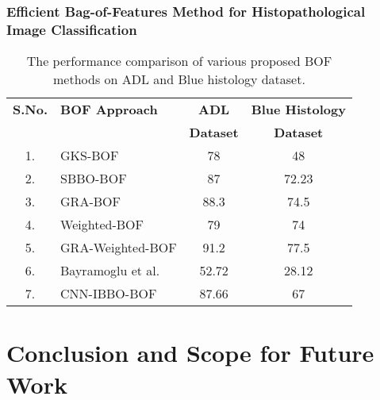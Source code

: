 \documentclass [9pt,times] {beamer}
\begin{document}
\begin{frame}\frametitle{Efficient Bag-of-Features Method for Histopathological Image Classification}
\rm
\begin{block}{}
\fontsize{8pt}{10pt}\selectfont
\begin{table}[!t]
\renewcommand{\arraystretch}{1.3}
\caption{The performance comparison of various proposed BOF methods  on ADL and Blue histology dataset.}
\label{Tab:classifier}
\centering
\footnotesize {
\begin{tabular}{c l c c}
  \hline
\textbf{S.No.} &\textbf{BOF Approach}&\textbf{ADL}& \textbf{Blue Histology}\\
 &&\textbf{ Dataset}& \textbf{ Dataset}\\
\hline
                   1. &GKS-BOF        & 78   & 48 \\
                   2. &SBBO-BOF        & 87  & 72.23 \\
                   3. &GRA-BOF            & 88.3  & 74.5     \\
                   4. &Weighted-BOF          & 79  & 74    \\
                   5. &GRA-Weighted-BOF     & 91.2  & 77.5     \\
                   6. &Bayramoglu et al. \cite{Bayramoglu2016} &52.72 & 28.12 \\
                   7. & CNN-IBBO-BOF \cite{Pal2018a}&87.66 &67\\
 \hline
\end{tabular}
}
\end{table}
\end{block}
\end{frame}













\section{Conclusion and Scope for Future Work}
\end{document}

